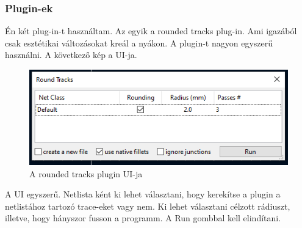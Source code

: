 \documentclass[a4paper,12pt,oneside]{book}
\begin{document}
\subsubsection{Plugin-ek}
Én két plug-in-t használtam. Az egyik a rounded tracks plug-in. Ami igazából csak esztétikai változásokat kreál a nyákon.
A plugin-t nagyon egyszerű használni. A következő kép a UI-ja.
\begin{figure}[H]
	\centering
	\includegraphics[trim=1mm 1mm 1mm 1mm,scale=0.75]{rounded ui.PNG}
	\caption{A rounded tracks plugin UI-ja}
	\label{A rounded tracks plugin UI-ja}
\end{figure}
A UI egyszerű. Netlista ként ki lehet választani, hogy kerekítse a plugin a netlistához tartozó trace-eket vagy nem. Ki lehet választani célzott rádiuszt, illetve,  hogy hányszor fusson a programm. A Run gombbal kell elindítani.
\end{document}
